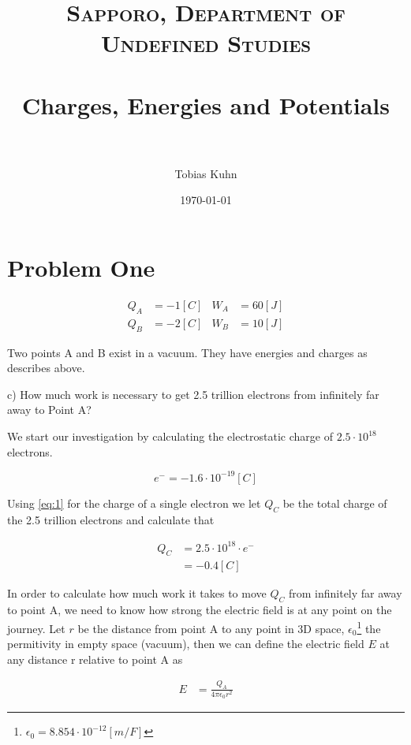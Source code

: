 \documentclass[paper=a4, fontsize=11pt]{scrartcl} %
\title{	
\normalfont \normalsize 
\textsc{Sapporo, Department of Undefined Studies} \\ [25pt] %
\horrule{0.5pt} \\[0.4cm] %
\huge Charges, Energies and Potentials\\ %
\horrule{2pt} \\[0.5cm] %
}
\author{Tobias Kuhn} %
\date{\normalsize\today} %
\numberwithin{equation}{section} %
\numberwithin{figure}{section} %
\numberwithin{table}{section} %
\begin{document}
\maketitle %


\section{ Problem One }

\begin{align} 
Q_A &= -1[C] & W_A &= 60[J] \\
Q_B &= -2[C] & W_B &= 10[J] 
\end{align}

Two points A and B exist in a vacuum. They have energies and charges as describes above.

c) How much work is necessary to get 2.5 trillion electrons from infinitely far away to Point A?

We start our investigation by calculating the electrostatic charge of $2.5 \cdot 10^{18}$ electrons.

\begin{equation} \label{eq:1}
e^- = -1.6 \cdot 10^{-19} [C]
\end{equation}

Using \ref{eq:1} for the charge of a single electron we let $Q_C$ be the total charge of the 2.5 trillion electrons and calculate that

\begin{align} \label{eq:1}
Q_C &= 2.5 \cdot 10^{18} \cdot e^- \\ &= -0.4 [C]
\end{align}

In order to calculate how much work it takes to move $Q_C$ from infinitely far away to point A,
we need to know how strong the electric field is at any point on the journey. 
Let $r$ be the distance from point A to any point in 3D space, $\epsilon_0$\footnote{$\epsilon_0 = 8.854 \cdot 10 ^ {-12} [m/F] $} the permitivity in empty space (vacuum),
then we can define the electric field $E$ at any distance r relative to point A as 

\begin{align} \label{eq:2}
E &= \frac{Q_A}{4 \pi \epsilon_0 r^2}
\end{align}
\end{document}
